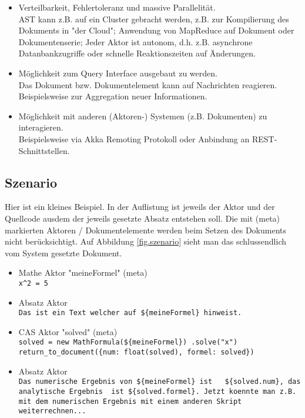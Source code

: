 \begin{itemize}
  \item Verteilbarkeit, Fehlertoleranz und massive Parallelität.\\
        AST kann z.B. auf ein Cluster gebracht werden, z.B. zur Kompilierung des Dokuments in "der Cloud"; Anwendung von MapReduce auf Dokument oder Dokumentenserie; Jeder Aktor ist autonom, d.h. z.B. asynchrone Datanbankzugriffe oder schnelle Reaktionszeiten auf Änderungen.
  \item Möglichkeit zum Query Interface ausgebaut zu werden.\\
        Das Dokument bzw. Dokumentelement kann auf Nachrichten reagieren. Beispielsweise zur Aggregation neuer Informationen.
  \item Möglichkeit mit anderen (Aktoren-) Systemen (z.B. Dokumenten) zu interagieren.\\
        Beispielsweise via Akka Remoting Protokoll oder Anbindung an REST-Schnittstellen.
\end{itemize}


\subsection{Szenario}

Hier ist ein kleines Beispiel. In der Auflistung ist jeweils der Aktor und der
Quellcode ausdem der jeweils gesetzte Absatz entstehen soll.
Die mit (meta) markierten Aktoren / Dokumentelemente werden beim Setzen des
Dokuments nicht berücksichtigt.
Auf Abbildung \ref{fig.szenario} sieht man das schlussendlich vom System gesetzte Dokument.

\begin{itemize}

  \item Mathe Aktor "meineFormel" (meta)\\
  \verb|x^2 = 5|

  \item Absatz Aktor\\
  \verb|Das ist ein Text welcher auf ${meineFormel} hinweist.|

  \item CAS Aktor "solved" (meta)\\
  \verb|solved = new MathFormula(${meineFormel}) .solve("x")|\\
  \verb|return_to_document({num: float(solved), formel: solved})|

  \item Absatz Aktor\\
  \verb|Das numerische Ergebnis von ${meineFormel} ist   ${solved.num}, das analytische Ergebnis  ist ${solved.formel}. Jetzt koennte man z.B. mit dem numerischen Ergebnis mit einem anderen Skript weiterrechnen...|

\end{itemize}

